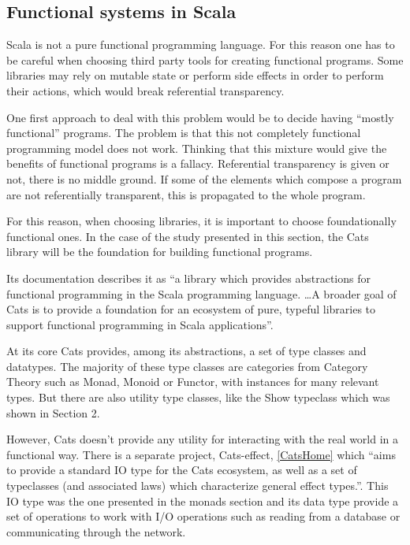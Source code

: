 \documentclass[../main.tex]{subfiles}
\begin{document}
\subsection{Functional systems in Scala}
Scala is not a pure functional programming language. For this reason one has to
be careful when choosing third party tools for creating functional programs.
Some libraries may rely on mutable state or perform side effects in order to
perform their actions, which would break referential transparency.

One first approach to deal with this problem would be to decide having ``mostly
functional'' programs. The problem is that this not completely functional
programming model does not work\autocite{MeijerTheWork}. Thinking that
this mixture would give the benefits of functional programs is a
fallacy. Referential transparency is given or not, there is no middle ground. If
some of the elements which compose a program are not referentially transparent,
this is propagated to the whole program.

For this reason, when choosing libraries, it is important to choose foundationally
functional ones. In the case of the study presented in this section, the Cats library
\autocite{Cats:Home} will be the foundation for building functional programs.

Its documentation describes it as ``a library which provides abstractions for
functional programming in the Scala programming language. \ldots A broader goal of
Cats is to provide a foundation for an ecosystem of pure, typeful libraries to
support functional programming in Scala applications''.

At its core Cats provides, among its abstractions, a set of type classes and
datatypes. The majority of these type classes are categories from Category Theory
such as Monad, Monoid or Functor, with instances for many relevant types. But
there are also utility type classes, like the Show typeclass which was shown in
Section 2.

However, Cats doesn't provide any utility for interacting with the real world in
a functional way. There is a separate project, Cats-effect, \ref{CatsHome}
which ``aims to
provide a standard IO type for the Cats ecosystem, as well as a set
of typeclasses (and associated laws) which characterize general effect types.''.
This IO type was the one presented in the monads section and its data type
provide a set of operations to work with I/O operations such as reading from a
database or communicating through the network.
\end{document}
